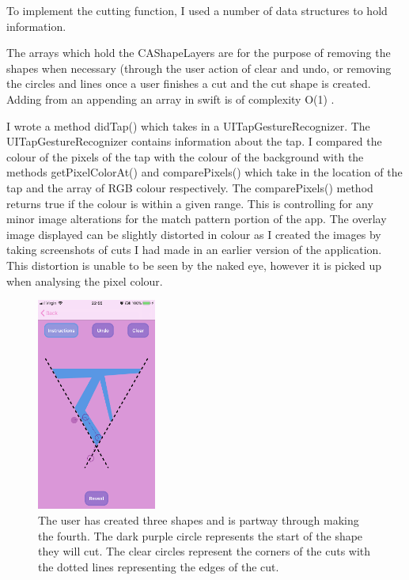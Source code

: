 \documentclass[11pt]{article}
\begin{document}
                 To implement the cutting function, I used a number of data structures to hold information. 
                 
                 The arrays which hold the CAShapeLayers are for the purpose of removing the shapes when necessary (through the user action of clear and undo, or removing the circles and lines once a user finishes a cut and the cut shape is created. Adding from an appending an array in swift is of complexity O(1) \cite{O1}. 
                 
                 I wrote a method didTap() which takes in a UITapGestureRecognizer. The UITapGestureRecognizer contains information about the tap. I compared the colour of the pixels of the tap with the colour of the background with the methods getPixelColorAt() and comparePixels() which take in the location of the tap and the array of RGB colour respectively. The comparePixels() method returns true if the colour is within a given range. This is controlling for any minor image alterations for the match pattern portion of the app. The overlay image displayed can be slightly distorted in colour as I created the images by taking screenshots of cuts I had made in an earlier version of the application. This distortion is unable to be seen by the naked eye, however it is picked up when analysing the pixel colour. 
                 
                 
                  \begin{figure}
                        \centering
                        \includegraphics[width=0.35\textwidth]{KiriZen/createPattern}
                        \caption{The user has created three shapes and is partway through making the fourth. The dark purple circle represents the start of the shape they will cut. The clear circles represent the corners of the cuts with the dotted lines representing the edges of the cut.}
                        \label{fig:kiriZen-createPattern}
                    \end{figure}
                    
\end{document}
